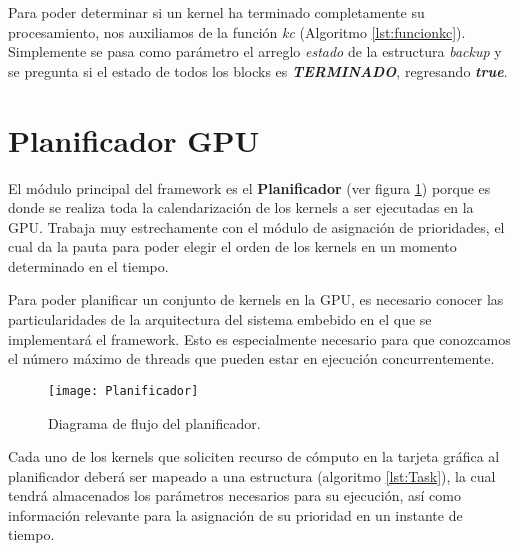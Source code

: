 

Para poder determinar si un kernel ha terminado completamente su procesamiento, nos auxiliamos de la función \textit{kc} (Algoritmo \ref{lst:funcionkc}). Simplemente se pasa como parámetro el arreglo \textit{estado} de la estructura \textit{backup} y se pregunta si el estado de todos los blocks es \textit{\textbf{TERMINADO}}, regresando \textbf{\textit{true}}.



\section{Planificador GPU} \label{secc:planificador}

El módulo principal del framework es el \textbf{Planificador} (ver figura \ref{fig:Planificador}) porque es donde se realiza toda la calendarización de los kernels a ser ejecutadas en la GPU. Trabaja muy estrechamente con el módulo de asignación de prioridades, el cual da la pauta para poder elegir el orden de los kernels en un momento determinado en el tiempo. 



Para poder planificar un conjunto de kernels en la GPU, es necesario conocer las particularidades de la arquitectura del sistema embebido en el que se implementará el framework. Esto es especialmente necesario para que conozcamos el número máximo de threads que pueden estar en ejecución concurrentemente.
\newline

    \begin{figure}[h!]
      \centering
        \texttt{[image: Planificador]}
        \caption{Diagrama de flujo del planificador.}
        \label{fig:Planificador}
    \end{figure}

Cada uno de los kernels que soliciten recurso de cómputo en la tarjeta gráfica al planificador deberá ser mapeado a una estructura (algoritmo \ref{lst:Task}), la cual tendrá almacenados los parámetros necesarios para su ejecución, así como información relevante para la asignación de su prioridad en un instante de tiempo.
\newline

